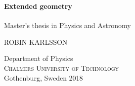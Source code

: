 
\begin{titlepage}
			
\addtolength{\voffset}{2cm}

\begin{figure}[H]
\centering
\vspace{2cm}	%
\end{figure}

\newcommand{\headtitle}{Extended geometry}
\newcommand{\subtitle}{An algebraic approach to the symmetries of M-theory}


\mbox{}
\vfill
\renewcommand{\familydefault}{\sfdefault} \normalfont %
\textbf{{\Huge 	\headtitle}} 	\\[0.5cm]
{\Large }\\[0.5cm]
Master's thesis in Physics and Astronomy \setlength{\parskip}{1cm}

{\Large ROBIN KARLSSON} \setlength{\parskip}{2.9cm}

Department of Physics \\
\textsc{Chalmers University of Technology} \\
Gothenburg, Sweden 2018

\renewcommand{\familydefault}{\rmdefault} \normalfont %
\end{titlepage}


\newpage
\restoregeometry
\thispagestyle{empty}
\mbox{}


